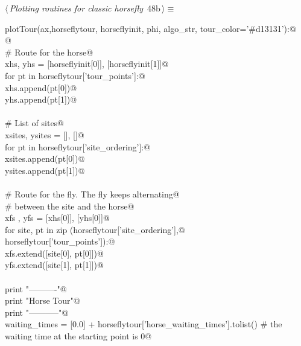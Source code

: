 \documentclass[11.5pt]{report}
\begin{document}
\begin{flushleft} \small\label{scrap61}\raggedright\small
{} $\langle\,${\itshape Plotting routines for classic horsefly}\nobreak\ {\footnotesize {48b}}$\,\rangle\equiv$
\vspace{-1ex}
\begin{list}{}{} \item
\mbox{}\verb@def plotTour(ax,horseflytour, horseflyinit, phi, algo_str, tour_color='#d13131'):@\\
\mbox{}\verb@   @\\
\mbox{}\verb@    # Route for the horse@\\
\mbox{}\verb@    xhs, yhs = [horseflyinit[0]], [horseflyinit[1]]@\\
\mbox{}\verb@    for pt in horseflytour['tour_points']:@\\
\mbox{}\verb@        xhs.append(pt[0])@\\
\mbox{}\verb@        yhs.append(pt[1])@\\
\mbox{}\verb@@\\
\mbox{}\verb@    # List of sites@\\
\mbox{}\verb@    xsites, ysites = [], []@\\
\mbox{}\verb@    for pt in horseflytour['site_ordering']:@\\
\mbox{}\verb@        xsites.append(pt[0])@\\
\mbox{}\verb@        ysites.append(pt[1])@\\
\mbox{}\verb@@\\
\mbox{}\verb@    # Route for the fly. The fly keeps alternating@\\
\mbox{}\verb@    # between the site and the horse@\\
\mbox{}\verb@    xfs , yfs = [xhs[0]], [yhs[0]]@\\
\mbox{}\verb@    for site, pt in zip (horseflytour['site_ordering'],@\\
\mbox{}\verb@                         horseflytour['tour_points']):@\\
\mbox{}\verb@        xfs.extend([site[0], pt[0]])@\\
\mbox{}\verb@        yfs.extend([site[1], pt[1]])@\\
\mbox{}\verb@@\\
\mbox{}\verb@    print "\n----------"@\\
\mbox{}\verb@    print "Horse Tour"@\\
\mbox{}\verb@    print "-----------"@\\
\mbox{}\verb@    waiting_times = [0.0] + horseflytour['horse_waiting_times'].tolist() # the waiting time at the starting point is 0@\\

\end{list}
\end{flushleft}
\end{document}
